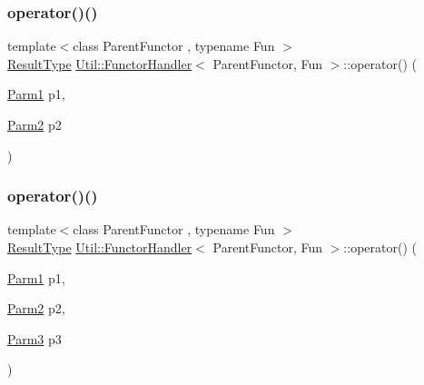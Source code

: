 \mbox{\label{classUtil_1_1FunctorHandler_a464269162477cf2b95690d94ec3fa02c}} 
\subsubsection{\texorpdfstring{operator()()}{operator()()}\hspace{0.1cm}{\footnotesize\ttfamily [6/12]}}
{\footnotesize\ttfamily template$<$class Parent\+Functor , typename Fun $>$ \\
\mbox{\hyperlink{classUtil_1_1FunctorHandler_a036da44b8cc2567704cebd2a20d16c80}{Result\+Type}} \mbox{\hyperlink{classUtil_1_1FunctorHandler}{Util\+::\+Functor\+Handler}}$<$ Parent\+Functor, Fun $>$\+::operator() (\begin{DoxyParamCaption}\item[{\mbox{\hyperlink{classUtil_1_1FunctorHandler_a0a902ba40a0ab746f1c29a81d68ae0db}{Parm1}}}]{p1,  }\item[{\mbox{\hyperlink{classUtil_1_1FunctorHandler_a5fb5374c316f8ac252aa22fcdf7d21a7}{Parm2}}}]{p2 }\end{DoxyParamCaption})\hspace{0.3cm}{\ttfamily [inline]}}

\mbox{\label{classUtil_1_1FunctorHandler_a7f8257ee5864ceec038116184231eb63}} 
\subsubsection{\texorpdfstring{operator()()}{operator()()}\hspace{0.1cm}{\footnotesize\ttfamily [7/12]}}
{\footnotesize\ttfamily template$<$class Parent\+Functor , typename Fun $>$ \\
\mbox{\hyperlink{classUtil_1_1FunctorHandler_a036da44b8cc2567704cebd2a20d16c80}{Result\+Type}} \mbox{\hyperlink{classUtil_1_1FunctorHandler}{Util\+::\+Functor\+Handler}}$<$ Parent\+Functor, Fun $>$\+::operator() (\begin{DoxyParamCaption}\item[{\mbox{\hyperlink{classUtil_1_1FunctorHandler_a0a902ba40a0ab746f1c29a81d68ae0db}{Parm1}}}]{p1,  }\item[{\mbox{\hyperlink{classUtil_1_1FunctorHandler_a5fb5374c316f8ac252aa22fcdf7d21a7}{Parm2}}}]{p2,  }\item[{\mbox{\hyperlink{classUtil_1_1FunctorHandler_a25f1b9dd7890c1dbc68abc686f30bec8}{Parm3}}}]{p3 }\end{DoxyParamCaption})\hspace{0.3cm}{\ttfamily [inline]}}

